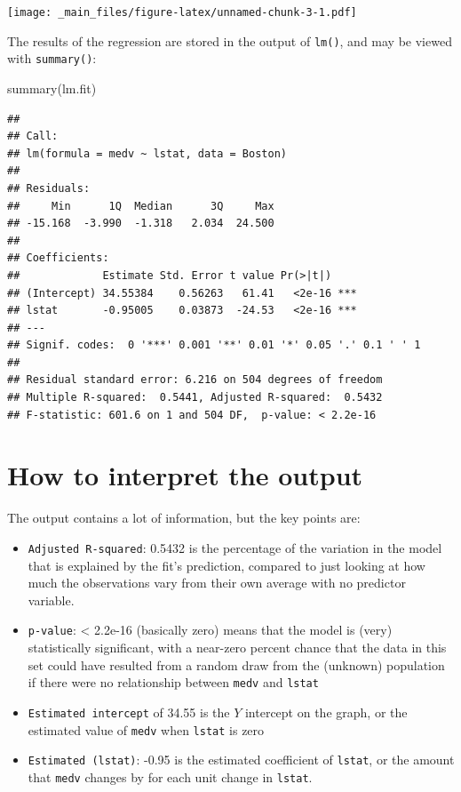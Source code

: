 \documentclass[
]{book}
\newenvironment{Shaded}{\begin{snugshade}}{\end{snugshade}}
\newcommand{\FunctionTok}[1]{\textcolor[rgb]{0.00,0.00,0.00}{#1}}
\newcommand{\NormalTok}[1]{#1}
\providecommand{\tightlist}{%
  \setlength{\itemsep}{0pt}\setlength{\parskip}{0pt}}
\begin{document}
\texttt{[image: \_main\_files/figure-latex/unnamed-chunk-3-1.pdf]}

The results of the regression are stored in the output of \texttt{lm()}, and may be viewed with \texttt{summary()}:

\begin{Shaded}
\begin{Highlighting}[]
\FunctionTok{summary}\NormalTok{(lm.fit)}
\end{Highlighting}
\end{Shaded}

\begin{verbatim}
## 
## Call:
## lm(formula = medv ~ lstat, data = Boston)
## 
## Residuals:
##     Min      1Q  Median      3Q     Max 
## -15.168  -3.990  -1.318   2.034  24.500 
## 
## Coefficients:
##             Estimate Std. Error t value Pr(>|t|)    
## (Intercept) 34.55384    0.56263   61.41   <2e-16 ***
## lstat       -0.95005    0.03873  -24.53   <2e-16 ***
## ---
## Signif. codes:  0 '***' 0.001 '**' 0.01 '*' 0.05 '.' 0.1 ' ' 1
## 
## Residual standard error: 6.216 on 504 degrees of freedom
## Multiple R-squared:  0.5441, Adjusted R-squared:  0.5432 
## F-statistic: 601.6 on 1 and 504 DF,  p-value: < 2.2e-16
\end{verbatim}

\hypertarget{how-to-interpret-the-output}{%
\section{How to interpret the output}\label{how-to-interpret-the-output}}

The output contains a lot of information, but the key points are:

\begin{itemize}
\tightlist
\item
  \texttt{Adjusted\ R-squared}: 0.5432 is the percentage of the variation in the model that is explained by the fit's prediction, compared to just looking at how much the observations vary from their own average with no predictor variable.
\item
  \texttt{p-value}: \textless{} 2.2e-16 (basically zero) means that the model is (very) statistically significant, with a near-zero percent chance that the data in this set could have resulted from a random draw from the (unknown) population if there were no relationship between \texttt{medv} and \texttt{lstat}
\item
  \texttt{Estimated\ intercept} of 34.55 is the \(Y\) intercept on the graph, or the estimated value of \texttt{medv} when \texttt{lstat} is zero
\item
  \texttt{Estimated\ (lstat)}: -0.95 is the estimated coefficient of \texttt{lstat}, or the amount that \texttt{medv} changes by for each unit change in \texttt{lstat}.
\end{itemize}
\end{document}
